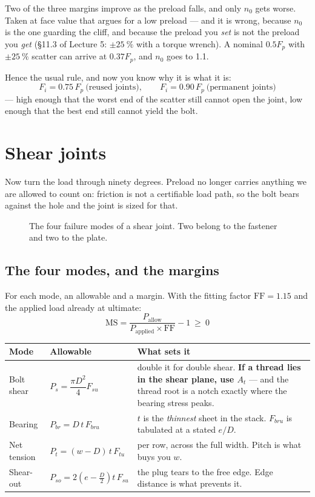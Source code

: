 \documentclass[11pt,a4paper]{article}
\begin{document}
\medskip
Two of the three margins improve as the preload falls, and only $n_0$ gets worse. Taken at face
value that argues for a low preload --- and it is wrong, because $n_0$ is the one guarding the
cliff, and because the preload you \emph{set} is not the preload you \emph{get}
(\S11.3 of Lecture 5: $\pm\SI{25}{\percent}$ with a torque wrench). A nominal $0.5F_p$ with
$\pm\SI{25}{\percent}$ scatter can arrive at $0.37F_p$, and $n_0$ goes to 1.1.

\medskip
Hence the usual rule, and now you know why it is what it is:
\[
F_i = 0.75\,F_p \ \text{(reused joints)},
\qquad
F_i = 0.90\,F_p \ \text{(permanent joints)}
\]
--- high enough that the worst end of the scatter still cannot open the joint, low enough that the
best end still cannot yield the bolt.

\section{Shear joints}
\label{sec:shear}

Now turn the load through ninety degrees. Preload no longer carries anything we are allowed to
count on: friction is not a certifiable load path, so the bolt bears against the hole and the joint
is sized for that.

\begin{figure}[H]\centering
\resizebox{\textwidth}{!}{}
\caption{The four failure modes of a shear joint. Two belong to the fastener and two to the plate.}
\label{fig:modes}
\end{figure}

\subsection{The four modes, and the margins}

For each mode, an allowable and a margin. With the fitting factor $\mathrm{FF}=1.15$ and the
applied load already at ultimate:
\[
\mathrm{MS}=\frac{P_{\text{allow}}}{P_{\text{applied}}\times \mathrm{FF}}-1\ \ge\ 0
\]

\begin{center}\footnotesize
\begin{tabular}{@{}p{2.9cm}p{4.3cm}p{8.0cm}@{}}
\toprule
Mode & Allowable & What sets it\\
\midrule
Bolt shear & $P_s=\dfrac{\pi D^2}{4}F_{su}$ &
  double it for double shear. \textbf{If a thread lies in the shear plane, use $A_t$} --- and the
  thread root is a notch exactly where the bearing stress peaks.\\[4pt]
Bearing & $P_{br}=D\,t\,F_{bru}$ &
  $t$ is the \emph{thinnest} sheet in the stack. $F_{bru}$ is tabulated at a stated $e/D$.\\[4pt]
Net tension & $P_t=(w-D)\,t\,F_{tu}$ &
  per row, across the full width. Pitch is what buys you $w$.\\[4pt]
Shear-out & $P_{so}=2\left(e-\tfrac{D}{2}\right)t\,F_{su}$ &
  the plug tears to the free edge. Edge distance is what prevents it.\\
\bottomrule
\end{tabular}
\end{center}
\end{document}

